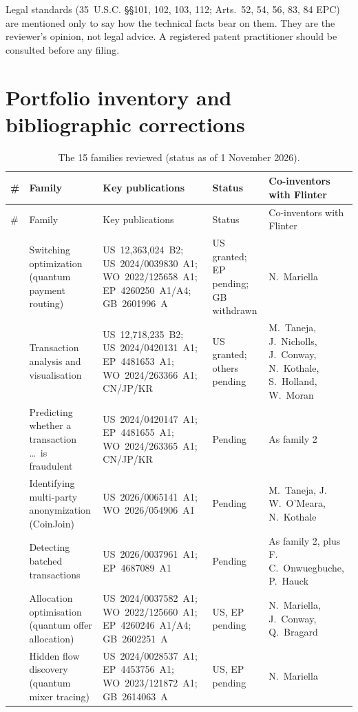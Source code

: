 \documentclass[10pt,a4paper]{article}
\begin{document}
Legal standards (35~U.S.C. \S\S101, 102, 103, 112; Arts.~52, 54, 56, 83, 84 EPC) are mentioned only to say how the technical facts bear on them. They are the reviewer's opinion, not legal advice. A registered patent practitioner should be consulted before any filing.

\section*{Portfolio inventory and bibliographic corrections}
\begingroup\small
\renewcommand{\arraystretch}{1.08}
\setlength{\tabcolsep}{4pt}
\begin{longtable}{>{\raggedright\arraybackslash}p{0.35cm}>{\raggedright\arraybackslash}p{3.4cm}>{\raggedright\arraybackslash}p{5.0cm}>{\raggedright\arraybackslash}p{2.3cm}>{\raggedright\arraybackslash}p{3.85cm}}
\caption{The 15 families reviewed (status as of 1 November 2026).}\\
\toprule
\# & Family & Key publications & Status & Co-inventors with Flinter \\
\midrule\endfirsthead
\toprule
\# & Family & Key publications & Status & Co-inventors with Flinter \\
\midrule\endhead
1 & Switching optimization (quantum payment routing) & US~12,363,024~B2; US~2024/0039830~A1; WO~2022/125658~A1; EP~4260250~A1/A4; GB~2601996~A & US granted; EP pending; GB withdrawn & N.~Mariella \\
2 & Transaction analysis and visualisation & US~12,718,235~B2; US~2024/0420131~A1; EP~4481653~A1; WO~2024/263366~A1; CN/JP/KR & US granted; others pending & M.~Taneja, J.~Nicholls, J.~Conway, N.~Kothale, S.~Holland, W.~Moran \\
3 & Predicting whether a transaction \ldots\ is fraudulent & US~2024/0420147~A1; EP~4481655~A1; WO~2024/263365~A1; CN/JP/KR & Pending & As family 2 \\
4 & Identifying multi-party anonymization (CoinJoin) & US~2026/0065141~A1; WO~2026/054906~A1 & Pending & M.~Taneja, J.\,W.~O'Meara, N.~Kothale \\
5 & Detecting batched transactions & US~2026/0037961~A1; EP~4687089~A1 & Pending & As family 2, plus F.\,C.~Onwuegbuche, P.~Hauck \\
6 & Allocation optimisation (quantum offer allocation) & US~2024/0037582~A1; WO~2022/125660~A1; EP~4260246~A1/A4; GB~2602251~A & US, EP pending & N.~Mariella, J.~Conway, Q.~Bragard \\
7 & Hidden flow discovery (quantum mixer tracing) & US~2024/0028537~A1; EP~4453756~A1; WO~2023/121872~A1; GB~2614063~A & US, EP pending & N.~Mariella \\

\end{longtable}
\end{document}
